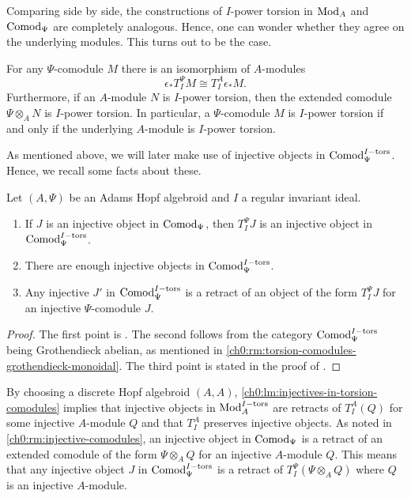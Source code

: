 Comparing side by side, the constructions of $I$-power torsion in $\mathrm{Mod}_A$ and $\mathrm{Comod}_\Psi$ are completely analogous. Hence, one can wonder whether they agree on the underlying modules. This turns out to be the case. 

\begin{lemma}
    \label{ch0:lm:torsion-comodule-iff-torsion-module}
    For any $\Psi$-comodule $M$ there is an isomorphism of $A$-modules 
    \[\epsilon_* T^\Psi_I M \cong T^A_I \epsilon_* M.\]
    Furthermore, if an $A$-module $N$ is $I$-power torsion, then the extended comodule $\Psi\otimes_A N$ is $I$-power torsion. In particular, a $\Psi$-comodule $M$ is $I$-power torsion if and only if the underlying $A$-module is $I$-power torsion. 
\end{lemma}

As mentioned above, we will later make use of injective objects in $\mathrm{Comod}_\Psi^{I-\mathrm{tors}}$. Hence, we recall some facts about these. 

\begin{lemma}
    \label{ch0:lm:injectives-in-torsion-comodules}
    Let $(A, \Psi)$ be an Adams Hopf algebroid and $I$ a regular invariant ideal.
    \begin{enumerate}
        \item If $J$ is an injective object in $\mathrm{Comod}_\Psi$, then $T_I^\Psi J$ is an injective object in $\mathrm{Comod}_\Psi^{I-\mathrm{tors}}$.
        \item There are enough injective objects in $\mathrm{Comod}_\Psi^{I-\mathrm{tors}}$.
        \item Any injective $J'$ in $\mathrm{Comod}_\Psi^{I-\mathrm{tors}}$ is a retract of an object of the form $T_I^\Psi J$ for an injective $\Psi$-comodule $J$.
    \end{enumerate} 
\end{lemma}
\begin{proof}
    The first point is \cite[2.1.4]{brodmann-sharp_1998}. The second follows from the category $\mathrm{Comod}_\Psi^{I-\mathrm{tors}}$ being Grothendieck abelian, as mentioned in \cref{ch0:rm:torsion-comodules-grothendieck-monoidal}. The third point is stated in the proof of \cite[3.16]{barthel-heard-valenzuela_2020}. 
\end{proof}

\begin{remark}
    \label{ch0:rm:injectives-in-torsion-modules}
    By choosing a discrete Hopf algebroid $(A,A)$, \cref{ch0:lm:injectives-in-torsion-comodules} implies that injective objects in $\mathrm{Mod}_A^{I-\mathrm{tors}}$ are retracts of $T_I^A(Q)$ for some injective $A$-module $Q$ and that $T_I^A$ preserves injective objects. As noted in \cref{ch0:rm:injective-comodules}, an injective object in $\mathrm{Comod}_\Psi$ is a retract of an extended comodule of the form $\Psi\otimes_A Q$ for an injective $A$-module $Q$. This means that any injective object $J$ in $\mathrm{Comod}_\Psi^{I-\mathrm{tors}}$ is a retract of $T_I^\Psi(\Psi\otimes_A Q)$ where $Q$ is an injective $A$-module. 
\end{remark}

